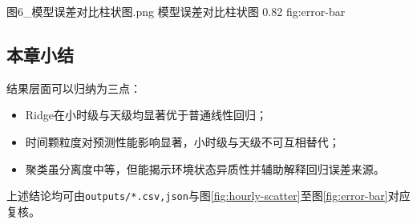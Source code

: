             {图6_模型误差对比柱状图.png}
            {模型误差对比柱状图}
            {0.82}
            {fig:error-bar}

\subsection{本章小结}

结果层面可以归纳为三点：
\begin{itemize}
    \item Ridge在小时级与天级均显著优于普通线性回归；
    \item 时间颗粒度对预测性能影响显著，小时级与天级不可互相替代；
    \item 聚类虽分离度中等，但能揭示环境状态异质性并辅助解释回归误差来源。
\end{itemize}

上述结论均可由\texttt{outputs/*.csv,json}与图\ref{fig:hourly-scatter}至图\ref{fig:error-bar}对应复核。
